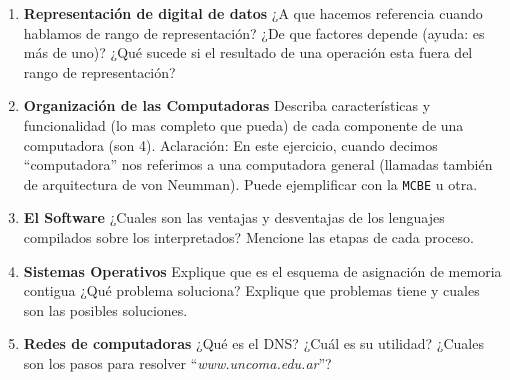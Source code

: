 \documentclass[12pt]{article}
\def\maketitle{

\makeatletter{
    \color{blue} \centering \huge \sc
    \textbf{
        Examen final regular
    }\\
    \par
}
\makeatother

\makeatletter


}
\begin{document}
\begin{minipage}[c]{\linewidth}
\thispagestyle{empty}
\maketitle
\setlength{\parindent}{0pt}

\begin{enumerate}[topsep=4pt,itemsep=2pt,partopsep=2pt, parsep=2pt]

    \item \textbf{Representación de digital de datos}
        ¿A que hacemos referencia cuando hablamos de rango de representación?
        ¿De que factores depende (ayuda: es más de uno)? ¿Qué sucede si el
        resultado de una operación esta fuera del rango de representación?

    \item \textbf{Organización de las Computadoras}
        Describa características y funcionalidad (lo mas completo que pueda)
        de cada componente de una computadora (son 4). Aclaración: En este
        ejercicio, cuando decimos ``computadora'' nos referimos a una
        computadora general (llamadas también de arquitectura de von Neumman).
        Puede ejemplificar con la \texttt{MCBE} u otra.

    \item \textbf{El Software}
        ¿Cuales son las ventajas y desventajas de los lenguajes compilados
        sobre los interpretados? Mencione las etapas de cada proceso.

    \item \textbf{Sistemas Operativos}
        Explique que es el esquema de asignación de memoria contigua ¿Qué
        problema soluciona? Explique que problemas tiene y cuales son las
        posibles soluciones.

    \item \textbf{Redes de computadoras}
        ¿Qué es el DNS? ¿Cuál es su utilidad? ¿Cuales son los pasos para
        resolver ``\emph{www.uncoma.edu.ar}''?

\end{enumerate}
\end{minipage}

\vspace{5em}
\end{document}
